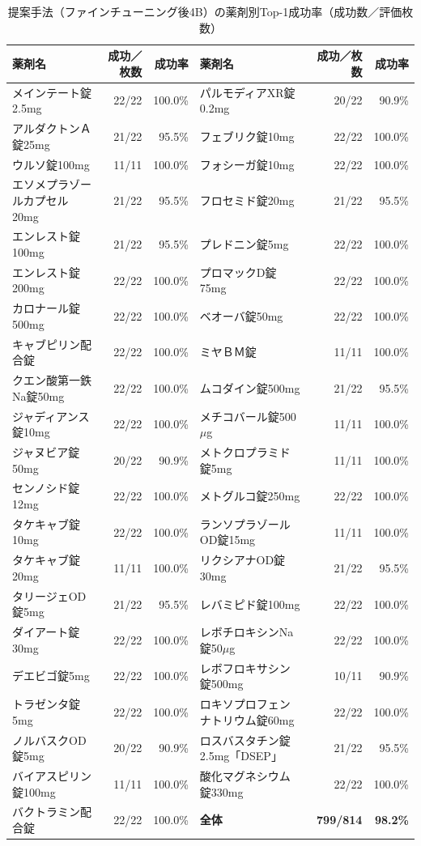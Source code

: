 \documentclass[dvipdfmx]{jsarticle}
\begin{document}
\begin{table}[htbp]
\centering
\caption{提案手法（ファインチューニング後4B）の薬剤別Top-1成功率（成功数／評価枚数）}
\label{tab:per_drug}
\scriptsize
\setlength{\tabcolsep}{3pt}
\begin{tabular}{lrr|lrr}
\hline
薬剤名 & 成功／枚数 & 成功率 & 薬剤名 & 成功／枚数 & 成功率 \\
\hline
メインテート錠2.5mg & 22/22 & 100.0\% & パルモディアXR錠0.2mg & 20/22 & 90.9\% \\
アルダクトンＡ錠25mg & 21/22 & 95.5\% & フェブリク錠10mg & 22/22 & 100.0\% \\
ウルソ錠100mg & 11/11 & 100.0\% & フォシーガ錠10mg & 22/22 & 100.0\% \\
エソメプラゾールカプセル20mg & 21/22 & 95.5\% & フロセミド錠20mg & 21/22 & 95.5\% \\
エンレスト錠100mg & 21/22 & 95.5\% & プレドニン錠5mg & 22/22 & 100.0\% \\
エンレスト錠200mg & 22/22 & 100.0\% & プロマックD錠75mg & 22/22 & 100.0\% \\
カロナール錠500mg & 22/22 & 100.0\% & ベオーバ錠50mg & 22/22 & 100.0\% \\
キャブピリン配合錠 & 22/22 & 100.0\% & ミヤＢＭ錠 & 11/11 & 100.0\% \\
クエン酸第一鉄Na錠50mg & 22/22 & 100.0\% & ムコダイン錠500mg & 21/22 & 95.5\% \\
ジャディアンス錠10mg & 22/22 & 100.0\% & メチコバール錠500$\mu$g & 11/11 & 100.0\% \\
ジャヌビア錠50mg & 20/22 & 90.9\% & メトクロプラミド錠5mg & 11/11 & 100.0\% \\
センノシド錠12mg & 22/22 & 100.0\% & メトグルコ錠250mg & 22/22 & 100.0\% \\
タケキャブ錠10mg & 22/22 & 100.0\% & ランソプラゾールOD錠15mg & 11/11 & 100.0\% \\
タケキャブ錠20mg & 11/11 & 100.0\% & リクシアナOD錠30mg & 21/22 & 95.5\% \\
タリージェOD錠5mg & 21/22 & 95.5\% & レバミピド錠100mg & 22/22 & 100.0\% \\
ダイアート錠30mg & 22/22 & 100.0\% & レボチロキシンNa錠50$\mu$g & 22/22 & 100.0\% \\
デエビゴ錠5mg & 22/22 & 100.0\% & レボフロキサシン錠500mg & 10/11 & 90.9\% \\
トラゼンタ錠5mg & 22/22 & 100.0\% & ロキソプロフェンナトリウム錠60mg & 22/22 & 100.0\% \\
ノルバスクOD錠5mg & 20/22 & 90.9\% & ロスバスタチン錠2.5mg「DSEP」 & 21/22 & 95.5\% \\
バイアスピリン錠100mg & 11/11 & 100.0\% & 酸化マグネシウム錠330mg & 22/22 & 100.0\% \\
バクトラミン配合錠 & 22/22 & 100.0\% & \textbf{全体} & \textbf{799/814} & \textbf{98.2\%} \\
\hline
\end{tabular}
\end{table}
\end{document}
